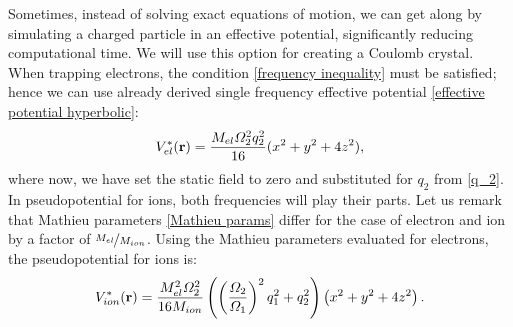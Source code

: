 Sometimes, instead of solving exact equations of motion, we can get along by simulating a charged particle in an effective potential, significantly reducing computational time. We will use this option for creating a Coulomb crystal. When trapping electrons, the condition \eqref{frequency inequality} must be satisfied; hence we can use already derived single frequency effective potential \eqref{effective potential hyperbolic}:
\begin{equation}
	\label{electron pseudopotential}
	V_{el}^*(\vb{r}) = \frac{M_{el} \Omega_2^2 q_2^2}{16}(x^2 + y^2 + 4 z^2),
\end{equation}
where now, we have set the static field to zero and substituted for $q_2$ from \eqref{q_2}. In pseudopotential for ions, both frequencies will play their parts. Let us remark that Mathieu parameters \eqref{Mathieu params} differ for the case of electron and ion by a factor of $\nicefrac{M_{el}}{M_{ion}}$. Using the Mathieu parameters evaluated for electrons, the pseudopotential for ions \cite{leefer2017investigation} is:
\begin{equation}
	\label{ion pseudopotential}
	V_{ion}^*(\vb{r}) = \frac{M_{el}^2 \Omega_2^2}{16 M_{ion}} \left( \left(\frac{\Omega_2}{\Omega_1}\right)^2 q_1^2 + q_2^2 \right) \left(x^2 + y^2 + 4z^2\right).
\end{equation} 

